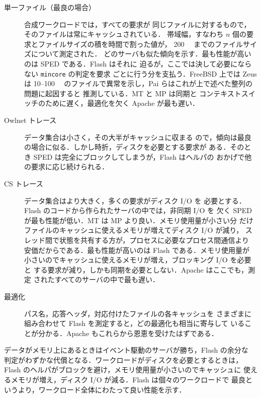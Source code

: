 \documentclass[../main.tex]{subfiles}
\begin{document}
\begin{description}
  \item[単一ファイル（最良の場合）] 合成ワークロードでは，すべての要求が
    同じファイルに対するもので，そのファイルは常にキャッシュされている．
    帯域幅，すなわち $n$ 個の要求とファイルサイズの積を時間で割った値が，
    \SI{200}{\kilo\byte} までのファイルサイズについて測定された．%
    どのサーバも似た傾向を示す．最も性能が高いのは SPED である．Flash はそれに
    迫るが，ここでは決して必要にならない \texttt{mincore} の判定を要求
    ごとに行う分を支払う．FreeBSD 上では Zeus は 10--\SI{100}{\kilo\byte}
    のファイルで異常を示し，Pai らはこれが上で述べた整列の問題に起因すると
    推測している．MT と MP は同期と
    コンテキストスイッチのために遅く，最適化を欠く Apache が最も遅い．
  \item[Owlnet トレース] データ集合は小さく，その大半がキャッシュに収まる
    ので，傾向は最良の場合に似る．しかし時折，ディスクを必要とする要求が
    ある．そのとき SPED は完全にブロックしてしまうが，Flash はヘルパの
    おかげで他の要求に応じ続けられる．
  \item[CS トレース] データ集合はより大きく，多くの要求がディスク I/O を
    必要とする．Flash のコードから作られたサーバの中では，非同期 I/O を
    欠く SPED が最も性能が低い．MT は MP より良い．メモリ使用量が小さい分
    だけファイルのキャッシュに使えるメモリが増えてディスク I/O が減り，
    スレッド間で状態を共有する方が，プロセスに必要なプロセス間通信より
    安価だからである．最も性能が高いのは Flash である．メモリ使用量が
    小さいのでキャッシュに使えるメモリが増え，ブロッキング I/O を必要と
    する要求が減り，しかも同期を必要としない．Apache はここでも，測定
    されたすべてのサーバの中で最も遅い．%
  \item[最適化] パス名，応答ヘッダ，対応付けたファイルの各キャッシュを
    さまざまに組み合わせて Flash を測定すると，どの最適化も相当に寄与して
    いることが分かる．Apache もこれらから恩恵を受けたはずである．
\end{description}

\begin{keypoint}
  データがメモリ上にあるときはイベント駆動のサーバが勝ち，Flash の余分な
  判定がわずかな代償となる．ワークロードがディスクを必要とするときは，
  Flash のヘルパがブロックを避け，メモリ使用量が小さいのでキャッシュに
  使えるメモリが増え，ディスク I/O が減る．Flash は個々のワークロードで
  最良というより，ワークロード全体にわたって良い性能を示す．
\end{keypoint}
\end{document}

